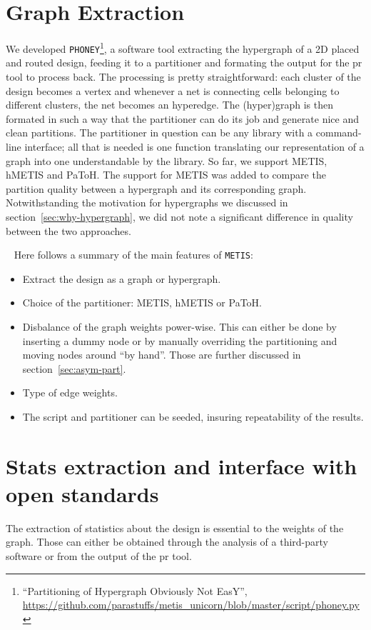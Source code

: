 \documentclass[11pt,a4paper]{report} %
\theoremstyle{customdef}
\begin{document}
\section{Graph Extraction}\label{sec:graph-extr}
We developed \texttt{PHONEY}\footnote{“Partitioning of Hypergraph Obviously Not EasY”, \url{https://github.com/parastuffs/metis_unicorn/blob/master/script/phoney.py}}, a software tool extracting the hypergraph of a 2D placed and routed design, feeding it to a partitioner and formating the output for the \gls{pr} tool to process back.
The processing is pretty straightforward: each cluster of the design becomes a vertex and whenever a net is connecting cells belonging to different clusters, the net becomes an hyperedge.
The (hyper)graph is then formated in such a way that the partitioner can do its job and generate nice and clean partitions.
The partitioner in question can be any library with a command-line interface; all that is needed is one function translating our representation of a graph into one understandable by the library.
So far, we support METIS, hMETIS and PaToH.
The support for METIS was added to compare the partition quality between a hypergraph and its corresponding graph.
Notwithstanding the motivation for hypergraphs we discussed in section~\ref{sec:why-hypergraph}, we did not note a significant difference in quality between the two approaches.


~\newline{}
Here follows a summary of the main features of \texttt{METIS}:
\begin{itemize}
	\item Extract the design as a graph or hypergraph.
	\item Choice of the partitioner: METIS, hMETIS or PaToH.
	\item Disbalance of the graph weights power-wise. This can either be done by inserting a dummy node or by manually overriding the partitioning and moving nodes around “by hand”. Those are further discussed in section~\ref{sec:asym-part}.
	\item Type of edge weights.
	\item The script and partitioner can be seeded, insuring repeatability of the results.
\end{itemize}



\section{Stats extraction and interface with open standards}
The extraction of statistics about the design is essential to the weights of the graph.
Those can either be obtained through the analysis of a third-party software or from the output of the \gls{pr} tool.
\end{document}
